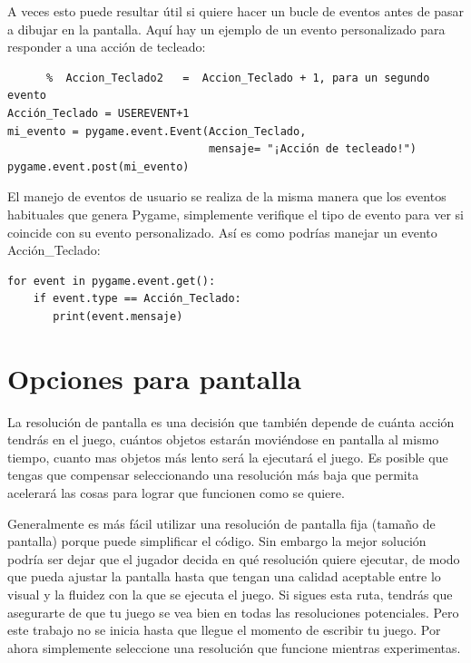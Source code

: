 
A veces esto puede resultar útil si quiere hacer un bucle de eventos antes de pasar a dibujar 
en la pantalla. Aquí hay un ejemplo de un evento personalizado para responder a una acción de tecleado: 
\begin{lstlisting}      %  Accion_Teclado2   =	Accion_Teclado + 1, para un segundo evento
Acción_Teclado = USEREVENT+1  
mi_evento = pygame.event.Event(Accion_Teclado,
                               mensaje= "¡Acción de tecleado!")
pygame.event.post(mi_evento)
\end{lstlisting}


El manejo de eventos de usuario se realiza de la misma manera que los eventos habituales que genera Pygame,
simplemente verifique el tipo de evento para ver si coincide con su evento personalizado. Así es como podrías manejar
un evento {\ttfamily Acción\_Teclado}:

\begin{lstlisting}		
for event in pygame.event.get():
    if event.type == Acción_Teclado:
       print(event.mensaje)	
\end{lstlisting}


\section{Opciones para pantalla} 

La resolución de pantalla es una decisión que también depende de cuánta acción tendrás en el juego, 
cuántos objetos estarán moviéndose en pantalla al mismo tiempo, cuanto mas objetos más lento será la ejecutará el juego. Es posible que tengas que compensar seleccionando una resolución más baja que permita acelerará las cosas para lograr que funcionen como se quiere.

Generalmente es más fácil utilizar una resolución de pantalla fija (tamaño de pantalla) porque puede simplificar el código. 
Sin embargo la mejor solución podría  ser dejar que el jugador decida en qué resolución quiere ejecutar, de modo que
pueda ajustar la pantalla hasta que tengan una calidad aceptable entre lo visual y la fluidez con la que se ejecuta el juego. 
Si sigues esta ruta, tendrás que asegurarte de que tu juego se vea bien en todas las resoluciones potenciales.  Pero este trabajo 
no se inicia hasta que llegue el momento de escribir tu juego. Por ahora simplemente seleccione una resolución que funcione mientras experimentas.

